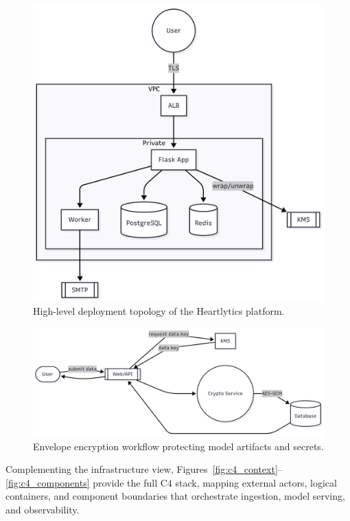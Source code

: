 \documentclass[12pt]{article}
\begin{document}
\begin{figure}[t]
  \centering
  \includegraphics[width=0.9\linewidth]{deployment_topology.png}
  \caption{High-level deployment topology of the Heartlytics platform.}
  \label{fig:topology}
\end{figure}

\begin{figure}[t]
  \centering
  \includegraphics[width=0.9\linewidth]{envelope_encryption_workflow.png}
  \caption{Envelope encryption workflow protecting model artifacts and secrets.}
  \label{fig:encryption}
\end{figure}

Complementing the infrastructure view, Figures~\ref{fig:c4_context}--\ref{fig:c4_components} provide the full C4 stack, mapping external actors, logical containers, and component boundaries that orchestrate ingestion, model serving, and observability.
\end{document}

